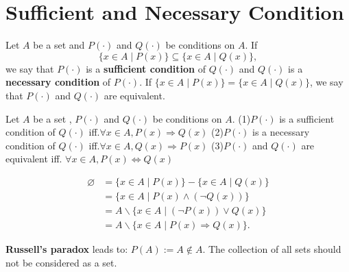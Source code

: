 \section{Sufficient and Necessary Condition}
\begin{definitionenv}
    Let $A$ be a set and $P(\cdot)$ and $Q(\cdot)$ be conditions on $A$.
    If $$\{x\in A\mid P(x)\}\subseteq\{x\in A\mid Q(x)\}, $$ we say that $P(\cdot)$ is a \textbf{sufficient condition} of $Q(\cdot)$ and $Q(\cdot)$ is a \textbf{necessary condition} of $P(\cdot)$. 
    If $\{x\in A\mid P(x)\}=\{x\in A\mid Q(x)\}$, we say that $P(\cdot)$ and $Q(\cdot)$ are equivalent.
\end{definitionenv}
\begin{propositionenv}
    Let $A$ be a set , $P(\cdot)$ and $Q(\cdot)$ be conditions on $A$.
    \newline
    (1)$P(\cdot)$ is a sufficient condition of $Q(\cdot)$ iff.$\forall x\in A, P(x)\Rightarrow Q(x)$
    \newline
    (2)$P(\cdot) $ is a necessary condition of $Q(\cdot)$ iff.$\forall x\in A, Q(x)\Rightarrow P(x)$
    \newline
    (3)$P(\cdot)$ and $Q(\cdot)$ are equivalent iff. $\forall x\in A, P(x)\Leftrightarrow Q(x)$
\end{propositionenv}
\begin{proofenv}
\begin{align*}
    \varnothing&=\{x\in A\mid P(x)\}- \{x\in A\mid Q(x)\}\\
    &=\{x\in A\mid P(x)\wedge (\neg Q(x))\}\\
    &=A\backslash\{x\in A\mid (\neg P(x))\vee  Q(x)\}\\
    &=A\backslash\{x\in A \mid P(x)\Rightarrow Q(x)\}.
\end{align*}
\end{proofenv}
\begin{box2}
\textbf{Russell's paradox} leads to: $P(A):=A\notin A$. The collection of all sets should not be considered as a set.
\end{box2}


